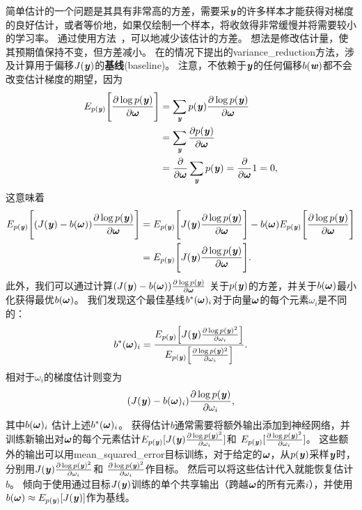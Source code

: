 简单估计的一个问题是其具有非常高的方差，需要采$\Vy$的许多样本才能获得对梯度的良好估计，或者等价地，如果仅绘制一个样本，将收敛得非常缓慢并将需要较小的学习率。
通过使用方法~\citep{Wilson-1984,LEcuyer-1994}，可以地减少该估计的方差。
想法是修改估计量，使其预期值保持不变，但方差减小。
在的情况下提出的\gls{variance_reduction}方法，涉及计算用于偏移$J(\Vy)$的\textbf{基线}(baseline)。
注意，不依赖于$\Vy$的任何偏移$b(\Vw)$都不会改变估计梯度的期望，因为
\begin{align}
 E_{p(\Vy)} \Bigg[ \frac{\partial\log p(\Vy)}{\partial \Vomega}  \Bigg] &=
 \sum_{\Vy} p(\Vy) \frac{\partial\log p(\Vy)}{\partial \Vomega} \\
 &= \sum_{\Vy} \frac{\partial p(\Vy)}{\partial \Vomega} \\
 &= \frac{\partial}{\partial \Vomega} \sum_{\Vy} p(\Vy) = 
 \frac{\partial}{\partial \Vomega} 1 = 0,
\end{align}
这意味着
\begin{align}
 E_{p(\Vy)} \Bigg[ (J(\Vy) - b(\Vomega))\frac{\partial\log p(\Vy)}{\partial \Vomega}  \Bigg] &= 
 E_{p(\Vy)} \Bigg[ J(\Vy) \frac{\partial\log p(\Vy)}{\partial \Vomega} \Bigg]
 - b(\Vomega) E_{p(\Vy)} \Bigg[ \frac{\partial\log p(\Vy)}{\partial \Vomega}  \Bigg] \\
 &= E_{p(\Vy)} \Bigg[ J(\Vy) \frac{\partial\log p(\Vy)}{\partial \Vomega} \Bigg] .
\end{align}
此外，我们可以通过计算$(J(\Vy) - b(\Vomega))\frac{\partial\log p(\Vy)}{\partial \Vomega} $
关于$p(\Vy)$的方差，并关于$b(\Vomega)$最小化获得最优$b(\Vomega)$。
我们发现这个最佳基线$b^*(\Vomega)_i$对于向量$\Vomega$的每个元素$\omega_i$是不同的：
\begin{align} \label{eq:est_b}
 b^*(\Vomega)_i = \frac{E_{p(\Vy)} \Big[ J(\Vy)
 \frac{\partial\log p(\Vy)^2}{\partial \omega_i}  \Big]}
{E_{p(\Vy)} \Big[\frac{\partial\log p(\Vy)^2}{\partial \omega_i}\Big] }.
\end{align}
相对于$\omega_i$的梯度估计则变为
\begin{align}
 (J(\Vy) - b(\Vomega)_i)\frac{\partial\log p(\Vy)}{\partial \omega_i},
\end{align}
其中$ b(\Vomega)_i$ 估计上述$ b^*(\Vomega)_i$。
获得估计$b$通常需要将额外输出添加到神经网络，并训练新输出对$\Vomega$的每个元素估计$E_{p(\Vy)} 
[J(\Vy)\frac{\partial\log p(\Vy)^2}{\partial \omega_i}]$和
$E_{p(\Vy)}[\frac{\partial\log p(\Vy)^2}{\partial \omega_i}]$。
这些额外的输出可以用\gls{mean_squared_error}目标训练，对于给定的$\Vomega$，从$p(\Vy)$采样$\Vy$时，分别用$J(\Vy)\frac{\partial\log p(\Vy)^2}{\partial \omega_i}$和 $\frac{\partial\log p(\Vy)^2}{\partial \omega_i}$作目标。
然后可以将这些估计代入就能恢复估计$b$。
\citet{Mnih+Gregor-ICML2014} 倾向于使用通过目标$J(\Vy)$训练的单个共享输出（跨越$\Vomega$的所有元素$i$），并使用$b(\Vomega) \approx E_{p(\Vy)} [J(\Vy)]$作为基线。

